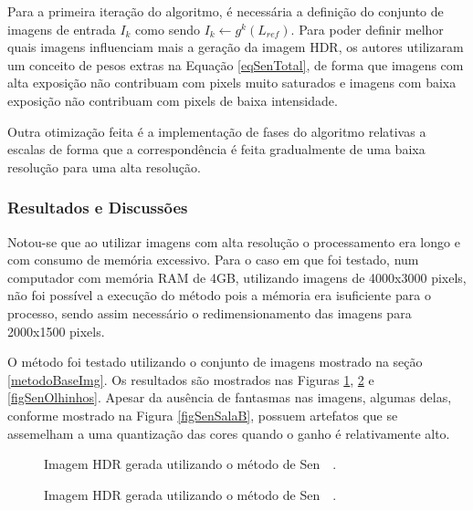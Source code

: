 Para a primeira iteração do algoritmo, é necessária a definição do conjunto de imagens de entrada ${I_k}$ como sendo $I_k \leftarrow g^k(L_{ref})$. Para poder definir melhor quais imagens influenciam mais a geração da imagem HDR, os autores utilizaram um conceito de pesos extras na Equação \ref{eqSenTotal}, de forma que imagens com alta exposição não contribuam com pixels muito saturados e imagens com baixa exposição não contribuam com pixels de baixa intensidade.

Outra otimização feita é a implementação de fases do algoritmo relativas a escalas de forma que a correspondência é feita gradualmente de uma baixa resolução para uma alta resolução.

\subsubsection{Resultados e Discussões} \label{MetodoSenResultado}

Notou-se que ao utilizar imagens com alta resolução o processamento era longo e com consumo de memória excessivo. Para o caso em que foi testado, num computador com memória RAM de 4GB, utilizando imagens de 4000x3000 pixels, não foi possível a execução do método pois a mémoria era isuficiente para o processo, sendo assim necessário o redimensionamento das imagens para 2000x1500 pixels.

O método foi testado utilizando o conjunto de imagens mostrado na seção \ref{metodoBaseImg}. Os resultados são mostrados nas Figuras \ref{figSenSala}, \ref{figSenPorquinho} e \ref{figSenOlhinhos}. Apesar da ausência de fantasmas nas imagens, algumas delas, conforme mostrado na Figura \ref{figSenSalaB}, possuem artefatos que se assemelham a uma quantização das cores quando o ganho é relativamente alto.

\begin{figure}[H]
  \centering
  \quad %
  \caption{Imagem HDR gerada utilizando o método de Sen~\etal~\protect\cite{hdrMovimento}.}
  \label{figSenSala}
\end{figure}

\begin{figure}[H]
  \centering
  \quad %
  \caption{Imagem HDR gerada utilizando o método de Sen~\etal~\protect\cite{hdrMovimento}.}
  \label{figSenPorquinho}
\end{figure}

